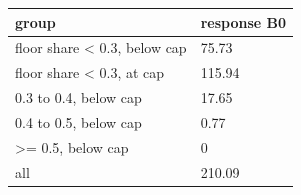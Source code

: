 \begingroup\small
\setlength{\tabcolsep}{3pt}
\renewcommand{\arraystretch}{1.04}
\begin{tabularx}{\linewidth}{XX}
\toprule
group & response B0 \\
\midrule
floor share \textless{} 0.3, below cap & 75.73 \\
floor share \textless{} 0.3, at cap & 115.94 \\
0.3 to 0.4, below cap & 17.65 \\
0.4 to 0.5, below cap & 0.77 \\
\textgreater{}= 0.5, below cap & 0 \\
all & 210.09 \\
\bottomrule
\end{tabularx}
\endgroup
